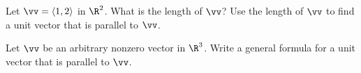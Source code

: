 \begin{activity} \label{A:9.2.8}

    \ba
    \item Let $\vv = \langle 1,2 \rangle$ in $\R^2$. What is the length of $\vv$? Use the length of $\vv$ to find a unit vector that is parallel to $\vv$.


    \item Let $\vv$ be an arbitrary nonzero vector in $\R^3$. Write a general formula for a unit vector that is parallel to $\vv$.


    \ea


\end{activity}
\begin{smallhint}

\end{smallhint}
\begin{bighint}

\end{bighint}
\begin{activitySolution}

\end{activitySolution}
\aftera
